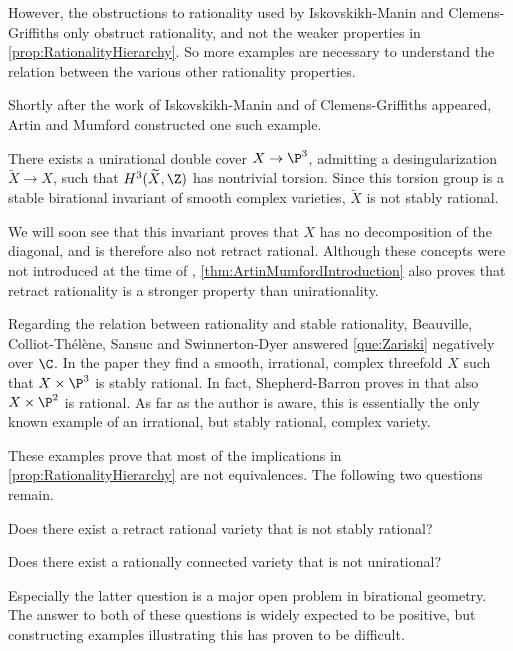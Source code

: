 However, the obstructions to rationality used by
Iskovskikh-Manin and Clemens-Griffiths
only obstruct rationality, and not the weaker properties in \cref{prop:RationalityHierarchy}. So more examples are necessary to understand the relation between the various other rationality properties.

Shortly after the work of Iskovskikh-Manin and of Clemens-Griffiths appeared, Artin and Mumford constructed one such example.
\begin{theorem}
	\label{thm:ArtinMumfordIntroduction}
	There exists a unirational double cover $X \to \P^3$, admitting a desingularization $\widetilde{X} \to X$, such that $H^3(\widetilde{X},\Z)$ has nontrivial torsion. Since this torsion group is a stable birational invariant of smooth complex varieties, $\widetilde{X}$ is not stably rational.
\end{theorem}
We will soon see that this invariant proves that $X$ has no decomposition of the diagonal, and is therefore also not retract rational. Although these concepts were not introduced at the time of \cite{ArtinMumford}, \cref{thm:ArtinMumfordIntroduction} also proves that retract rationality is a stronger property than unirationality.

Regarding the relation between rationality and stable rationality, Beauville, Colliot-Thélène, Sansuc and Swinnerton-Dyer answered \cref{que:Zariski} negatively over $\C$. In the paper \cite{BCTSSD} they find a smooth, irrational, complex threefold $X$ such that $X \times \P^3$ is stably rational. In fact, Shepherd-Barron proves in \cite{Shepherd-Barron} that also $X \times \P^2$ is rational. As far as the author is aware, this is essentially the only known example of an irrational, but stably rational, complex variety.

These examples prove that most of the implications in \cref{prop:RationalityHierarchy} are not equivalences. The following two questions remain.
\begin{question}
	\label{que:StableVsRetract}
	Does there exist a retract rational variety that is not stably rational?
\end{question}

\begin{question}
	\label{que:RationallyConnectedVsUnirational}
	Does there exist a rationally connected variety that is not unirational?
\end{question}
Especially the latter question is a major open problem in birational geometry. The answer to both of these questions is widely expected to be positive, but constructing examples illustrating this has proven to be difficult.

